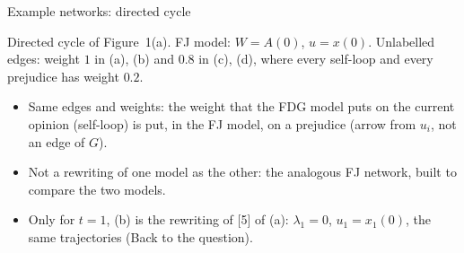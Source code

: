 \documentclass[10pt, aspectratio=169]{beamer}
\begin{document}
\begin{frame}[label=m-fj-graphs]{Example networks: directed cycle}
\hfill

  \smallskip
  {\scriptsize Directed cycle of Figure~1(a). FJ model: $W = A(0)$, $u = x(0)$. Unlabelled
  edges: weight $1$ in (a), (b) and $0.8$ in (c), (d), where every self-loop and every
  prejudice has weight $0.2$.\par}

  \medskip
  \footnotesize
  \begin{itemize}
    \item Same edges and weights: the weight that the FDG model puts on the
          \alert{current opinion} (self-loop) is put, in the FJ model, on a
          \alert{prejudice} (arrow from $u_i$, not an edge of $G$).
    \item Not a rewriting of one model as the other: the analogous FJ network, built to
          compare the two models.
    \item Only for $t = 1$, (b) is the rewriting of [5] of (a): $\lambda_1 = 0$,
          $u_1 = x_1(0)$, the same trajectories (Back to the question).
  \end{itemize}
\end{frame}
\end{document}
